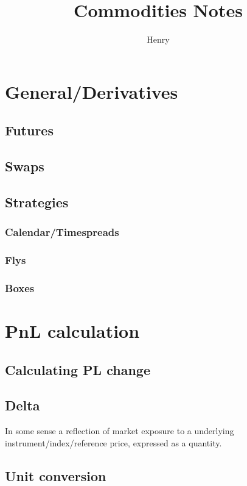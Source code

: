 \documentclass{article}
\title{Commodities Notes}
\author{Henry}
\begin{document}
\maketitle


\tableofcontents


\section{General/Derivatives}
\subsection{Futures}
\subsection{Swaps}
\subsection{Strategies}
\subsubsection{Calendar/Timespreads}
\subsubsection{Flys}
\subsubsection{Boxes}

\section{PnL calculation}
\subsection{Calculating PL change}

\subsection{Delta}

In some sense a reflection of market exposure to a underlying instrument/index/reference price, expressed as a quantity.

\subsection{Unit conversion}
\end{document}
